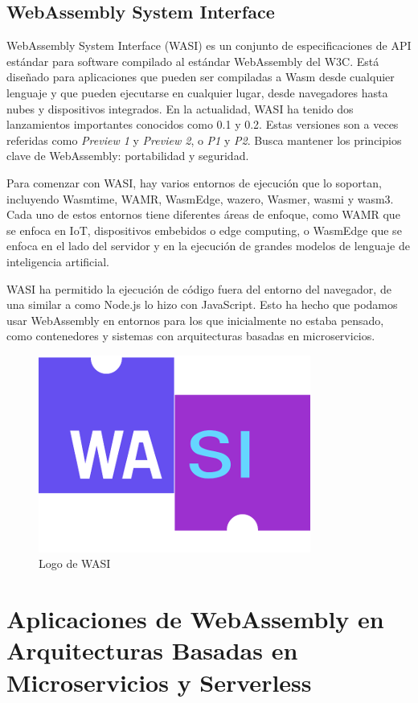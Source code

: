 \subsection{WebAssembly System Interface}

WebAssembly System Interface (WASI) es un conjunto de especificaciones de API estándar para software compilado al estándar WebAssembly del W3C. Está diseñado para aplicaciones que pueden ser compiladas a Wasm desde cualquier lenguaje y que pueden ejecutarse en cualquier lugar, desde navegadores hasta nubes y dispositivos integrados. En la actualidad, WASI ha tenido dos lanzamientos importantes conocidos como 0.1 y 0.2. Estas versiones son a veces referidas como \textit{Preview 1} y \textit{Preview 2}, o \textit{P1} y \textit{P2}. Busca mantener los principios clave de WebAssembly: portabilidad y seguridad.

Para comenzar con WASI, hay varios entornos de ejecución que lo soportan, incluyendo Wasmtime, WAMR, WasmEdge, wazero, Wasmer, wasmi y wasm3. Cada uno de estos entornos tiene diferentes áreas de enfoque, como WAMR que se enfoca en IoT, dispositivos embebidos o edge computing, o WasmEdge que se enfoca en el lado del servidor y en la ejecución de grandes modelos de lenguaje de inteligencia artificial.

WASI ha permitido la ejecución de código fuera del entorno del navegador, de una similar a como Node.js lo hizo con JavaScript. Esto ha hecho que podamos usar WebAssembly en entornos para los que inicialmente no estaba pensado, como contenedores y sistemas con arquitecturas basadas en microservicios.

\begin{figure}[h!]
    \centering
    \includegraphics[width=0.5\linewidth]{figures/wasi.png}
    \caption{Logo de WASI}
    \label{fig:wasi-logo}
\end{figure}

\section{Aplicaciones de WebAssembly en Arquitecturas Basadas en Microservicios y Serverless}

